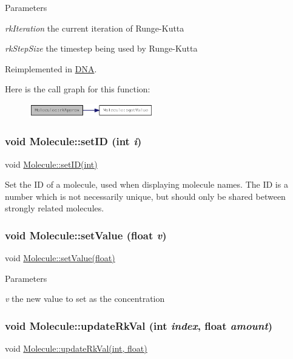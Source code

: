 \begin{DoxyParams}{Parameters}
\item[{\em rkIteration}]the current iteration of Runge-\/Kutta \item[{\em rkStepSize}]the timestep being used by Runge-\/Kutta \end{DoxyParams}


Reimplemented in \hyperlink{classDNA_a10bec8cdc5922b2780887666c53891f1}{DNA}.

Here is the call graph for this function:\nopagebreak
\begin{figure}[H]
\begin{center}
\leavevmode
\includegraphics[width=154pt]{classMolecule_adabb58a65655a7f55dae0d82b65d04ba_cgraph}
\end{center}
\end{figure}
\hypertarget{classMolecule_a4f1f48fc2b13b96d7f8015394895e240}{
\subsubsection[{setID}]{\setlength{\rightskip}{0pt plus 5cm}void Molecule::setID (int {\em i})}}
\label{classMolecule_a4f1f48fc2b13b96d7f8015394895e240}
void \hyperlink{classMolecule_a4f1f48fc2b13b96d7f8015394895e240}{Molecule::setID(int)}

Set the ID of a molecule, used when displaying molecule names. The ID is a number which is not necessarily unique, but should only be shared between strongly related molecules. \hypertarget{classMolecule_a227fedba365853cee63c4e18669a56fa}{
\subsubsection[{setValue}]{\setlength{\rightskip}{0pt plus 5cm}void Molecule::setValue (float {\em v})}}
\label{classMolecule_a227fedba365853cee63c4e18669a56fa}
void \hyperlink{classMolecule_a227fedba365853cee63c4e18669a56fa}{Molecule::setValue(float)}


\begin{DoxyParams}{Parameters}
\item[{\em v}]the new value to set as the concentration \end{DoxyParams}
\hypertarget{classMolecule_ab1dd1cb050ddb53a5ce4d9635e3ae03b}{
\subsubsection[{updateRkVal}]{\setlength{\rightskip}{0pt plus 5cm}void Molecule::updateRkVal (int {\em index}, \/  float {\em amount})}}
\label{classMolecule_ab1dd1cb050ddb53a5ce4d9635e3ae03b}
void \hyperlink{classMolecule_ab1dd1cb050ddb53a5ce4d9635e3ae03b}{Molecule::updateRkVal(int, float)}

